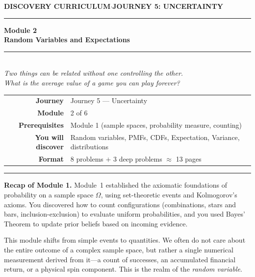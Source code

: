 \documentclass[12pt, a4paper]{article}
\newcounter{problem}
\begin{document}
\thispagestyle{empty}
\begin{center}
{\small\color{MidBlue}\textbf{DISCOVERY CURRICULUM}\quad$\cdot$\quad\textbf{JOURNEY 5: UNCERTAINTY}}
\vspace{0.6cm}

{\color{NavyBlue}\rule{\linewidth}{2pt}}\vspace{0.5cm}

{\Huge\bfseries\color{NavyBlue}Module 2}\\[0.3cm]
{\LARGE\bfseries\color{MidBlue}Random Variables and Expectations}\\[0.4cm]
{\color{Gold}\rule{0.4\linewidth}{1.2pt}}\\[0.4cm]
{\large\itshape\color{DarkGrey}
Two things can be related without one controlling the other.\\[0.15cm]
What is the average value of a game you can play forever?}

\vspace{1cm}
\begin{tabular}{rl}
\color{DarkGrey}\textbf{Journey}           & Journey 5 --- Uncertainty \\[4pt]
\color{DarkGrey}\textbf{Module}            & 2 of 6 \\[4pt]
\color{DarkGrey}\textbf{Prerequisites}     & Module 1 (sample spaces, probability measure, counting) \\[4pt]
\color{DarkGrey}\textbf{You will discover} & Random variables, PMFs, CDFs, Expectation, Variance, distributions \\[4pt]
\color{DarkGrey}\textbf{Format}            & 8 problems $+$ 3 deep problems $\approx$ 13 pages \\
\end{tabular}
\vspace{1cm}

{\color{NavyBlue}\rule{\linewidth}{2pt}}
\end{center}

\vspace{0.5cm}
\noindent\textbf{Recap of Module 1.}
Module~1 established the axiomatic foundations of probability on a sample space $\Omega$, using set-theoretic events and Kolmogorov’s axioms. You discovered how to count configurations (combinations, stars and bars, inclusion-exclusion) to evaluate uniform probabilities, and you used Bayes' Theorem to update prior beliefs based on incoming evidence.

\medskip
This module shifts from simple events to quantities. We often do not care about the entire outcome of a complex sample space, but rather a single numerical measurement derived from it—a count of successes, an accumulated financial return, or a physical spin component. This is the realm of the \emph{random variable}.
\end{document}
